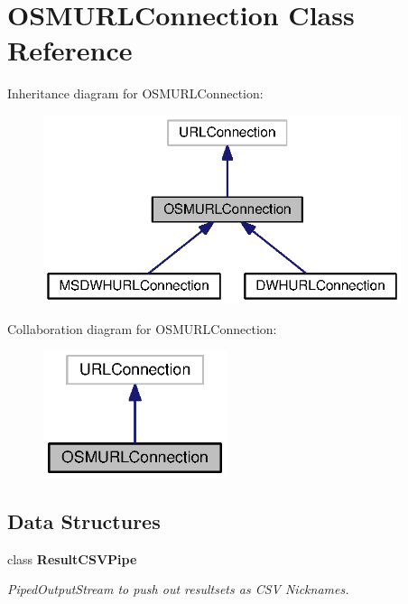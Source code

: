 \section{O\+S\+M\+U\+R\+L\+Connection Class Reference}
\label{classorg_1_1smallfoot_1_1parser_1_1osmsql_1_1OSMURLConnection}


Inheritance diagram for O\+S\+M\+U\+R\+L\+Connection\+:\nopagebreak
\begin{figure}[H]
\begin{center}
\leavevmode
\includegraphics[width=297pt]{classorg_1_1smallfoot_1_1parser_1_1osmsql_1_1OSMURLConnection__inherit__graph}
\end{center}
\end{figure}


Collaboration diagram for O\+S\+M\+U\+R\+L\+Connection\+:\nopagebreak
\begin{figure}[H]
\begin{center}
\leavevmode
\includegraphics[width=152pt]{classorg_1_1smallfoot_1_1parser_1_1osmsql_1_1OSMURLConnection__coll__graph}
\end{center}
\end{figure}
\subsection*{Data Structures}
\begin{DoxyCompactItemize}
\item 
class {\bf Result\+C\+S\+V\+Pipe}
\begin{DoxyCompactList}\small\item\em Piped\+Output\+Stream to push out resultsets as C\+S\+V Nicknames. \end{DoxyCompactList}\end{DoxyCompactItemize}
